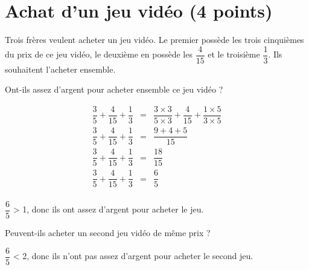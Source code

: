 \section{Achat d'un jeu vidéo (4 points)}

Trois frères veulent acheter un jeu vidéo. Le premier possède les trois cinquièmes du prix de ce jeu vidéo, le deuxième en possède les $\dfrac{4}{15}$ et le troisième $\dfrac{1}{3}$. Ils souhaitent l'acheter ensemble.

\begin{questions}
	\question[2] Ont-ils assez d'argent pour acheter ensemble ce jeu vidéo ?
	\begin{solution}
		\begin{eqnarray*}
			\dfrac{3}{5} + \dfrac{4}{15} + \dfrac{1}{3} &=& \dfrac{3 \times 3}{5 \times 3} + \dfrac{4}{15} + \dfrac{1 \times 5}{3 \times 5}\\
			\dfrac{3}{5} + \dfrac{4}{15} + \dfrac{1}{3} &=& \dfrac{9 + 4 + 5 }{15}\\
			\dfrac{3}{5} + \dfrac{4}{15} + \dfrac{1}{3} &=& \dfrac{18}{15}\\
			\dfrac{3}{5} + \dfrac{4}{15} + \dfrac{1}{3} &=& \dfrac{6}{5}\\
		\end{eqnarray*}
		
		$\dfrac{6}{5}$ > 1, donc ils ont assez d'argent pour acheter le jeu.
	\end{solution}
	
	\question[2] Peuvent-ils acheter un second jeu vidéo de même prix ?
	
	$\dfrac{6}{5}$ < 2, donc ils n'ont pas assez d'argent pour acheter le second jeu.
\end{questions}


